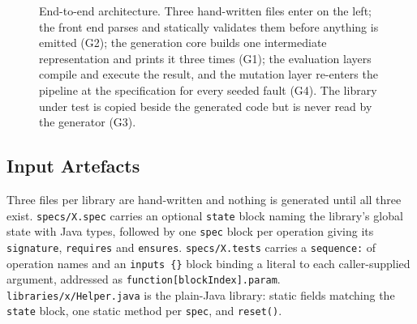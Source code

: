 \documentclass[conference]{IEEEtran}
\begin{document}
\begin{figure}[htbp]
{}
    \caption{End-to-end architecture. Three hand-written files enter on the left;
    the front end parses and statically validates them before anything is emitted
    (G2); the generation core builds one intermediate representation and prints it
    three times (G1); the evaluation layers compile and execute the result, and the
    mutation layer re-enters the pipeline at the specification for every seeded
    fault (G4). The library under test is copied beside the generated code but is
    never read by the generator (G3).}
    \label{fig:pipeline}
\end{figure}

\subsection{Input Artefacts}

Three files per library are hand-written and nothing is generated until all three
exist. \texttt{specs/X.spec} carries an optional \texttt{state} block naming the
library's global state with Java types, followed by one \texttt{spec} block per
operation giving its \texttt{signature}, \texttt{requires} and \texttt{ensures}.
\texttt{specs/X.tests} carries a \texttt{sequence:} of operation names and an
\texttt{inputs \{\}} block binding a literal to each caller-supplied argument,
addressed as \texttt{function[blockIndex].param}. \texttt{libraries/x/Helper.java}
is the plain-Java library: static fields matching the \texttt{state} block, one
static method per \texttt{spec}, and \texttt{reset()}.
\end{document}
